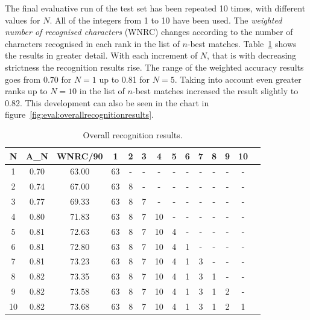 The final evaluative run of the test set has been repeated 10 times, 
with different values for \(N\). All of the integers from 1 to 10 have
been used. The \emph{weighted number of recognised characters} (WNRC) changes 
according to the number of characters recognised in each rank in the
list of \(n\)-best matches. Table~\ref{table:eval:overallrecognitionresults}
shows the results in greater detail. With each increment of \(N\),
that is with decreasing strictness the recognition results rise.
The range of the weighted accuracy results goes from 0.70 for \(N=1\) 
up to 0.81 for \(N=5\). Taking into account even greater ranks up 
to \(N = 10\) in the list of \(n\)-best matches increased the result slightly
to 0.82. This development can also be seen in the chart in 
figure~\ref{fig:eval:overallrecognitionresults}.
\begin{table}[htbp]
\begin{center}
  \begin{tabular}{|c|c|c|c|c|c|c|c|c|c|c|c|c|p{200pt}|}
    \hline
N & A_N  &WNRC/90&  1 & 2 & 3 & 4  & 5 & 6 & 7 & 8 & 9 & 10 \\
    \hline
1 & 0.70 & 63.00 & 63 & - & - & -  & - & - & - & - & - & -  \\
    \hline
2 & 0.74 & 67.00 & 63 & 8 & - & -  & - & - & - & - & - & -  \\
    \hline
3 & 0.77 & 69.33 & 63 & 8 & 7 & -  & - & - & - & - & - & -  \\
    \hline
4 & 0.80 & 71.83 & 63 & 8 & 7 & 10 & - & - & - & - & - & -  \\
    \hline
5 & 0.81 & 72.63 & 63 & 8 & 7 & 10 & 4 & - & - & - & - & -  \\
    \hline
6 & 0.81 & 72.80 & 63 & 8 & 7 & 10 & 4 & 1 & - & - & - & -  \\
    \hline
7 & 0.81 & 73.23 & 63 & 8 & 7 & 10 & 4 & 1 & 3 & - & - & -  \\
    \hline
8 & 0.82 & 73.35 & 63 & 8 & 7 & 10 & 4 & 1 & 3 & 1 & - & -  \\
    \hline
9 & 0.82 & 73.58 & 63 & 8 & 7 & 10 & 4 & 1 & 3 & 1 & 2 & -  \\
    \hline
10& 0.82 & 73.68 & 63 & 8 & 7 & 10 & 4 & 1 & 3 & 1 & 2 & 1  \\
    \hline
  \end{tabular}
\end{center}
\caption{Overall recognition results.}
\label{table:eval:overallrecognitionresults}
\end{table}
